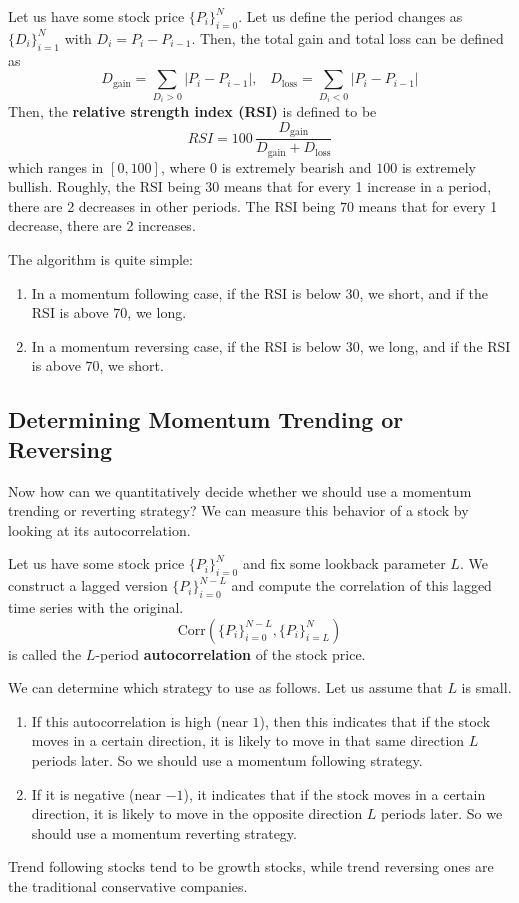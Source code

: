 \documentclass{article}
\begin{document}
    \begin{definition}
      Let us have some stock price $\{P_i\}_{i=0}^N$. Let us define the period changes as $\{D_i\}_{i=1}^N$ with $D_i = P_i - P_{i-1}$. Then, the total gain and total loss can be defined as 
      \[D_\mathrm{gain} = \sum_{D_i > 0} |P_i - P_{i-1}|, \;\;\; D_{\mathrm{loss}} = \sum_{D_i < 0} |P_i - P_{i-1}|\]
      Then, the \textbf{relative strength index (RSI)} is defined to be 
      \[RSI = 100 \, \frac{D_{\mathrm{gain}}}{D_\mathrm{gain} + D_{\mathrm{loss}}}\]
      which ranges in $[0, 100]$, where $0$ is extremely bearish and $100$ is extremely bullish. Roughly, the RSI being $30$ means that for every 1 increase in a period, there are 2 decreases in other periods. The RSI being $70$ means that for every 1 decrease, there are 2 increases. 
    \end{definition}

    The algorithm is quite simple: 
    \begin{enumerate}
      \item In a momentum following case, if the RSI is below $30$, we short, and if the RSI is above $70$, we long. 
      \item In a momentum reversing case, if the RSI is below $30$, we long, and if the RSI is above $70$, we short. 
    \end{enumerate}

  \subsection{Determining Momentum Trending or Reversing}

    Now how can we quantitatively decide whether we should use a momentum trending or reverting strategy? We can measure this behavior of a stock by looking at its autocorrelation. 

    \begin{definition}[Autocorrelation]
      Let us have some stock price $\{P_i\}_{i=0}^N$ and fix some lookback parameter $L$. We construct a lagged version $\{P_i\}_{i=0}^{N-L}$ and compute the correlation of this lagged time series with the original. 
      \[\mathrm{Corr}(\{P_i\}_{i=0}^{N-L}, \{P_i\}_{i = L}^{N})\]
      is called the $L$-period \textbf{autocorrelation} of the stock price. 
    \end{definition}

    We can determine which strategy to use as follows. Let us assume that $L$ is small.  
    \begin{enumerate}
      \item If this autocorrelation is high (near $1$), then this indicates that if the stock moves in a certain direction, it is likely to move in that same direction $L$ periods later. So we should use a momentum following strategy. 
      \item If it is negative (near $-1$), it indicates that if the stock moves in a certain direction, it is likely to move in the opposite direction $L$ periods later. So we should use a momentum reverting strategy. 
    \end{enumerate}
    Trend following stocks tend to be growth stocks, while trend reversing ones are the traditional conservative companies. 
\end{document}
